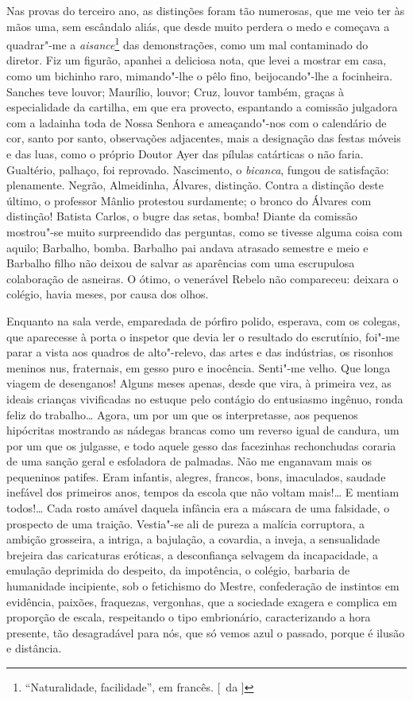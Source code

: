 Nas provas do terceiro ano, as distinções foram
tão numerosas, que me veio ter às mãos uma, sem escândalo aliás, que
desde muito perdera o medo e começava a quadrar"-me a \textit{aisance}\footnote{ ``Naturalidade, 
facilidade'', em francês. [~da ]} das
demonstrações, como um mal contaminado do diretor. Fiz um figurão,
apanhei a deliciosa nota, que levei a mostrar em casa, como um bichinho
raro, mimando"-lhe o pêlo fino, beijocando"-lhe a focinheira. Sanches
teve louvor; Maurílio, louvor; Cruz, louvor também, graças à
especialidade da cartilha, em que era provecto, espantando a comissão
julgadora com a ladainha toda de Nossa Senhora e ameaçando"-nos com o
calendário de cor, santo por santo, observações adjacentes, mais a
designação das festas móveis e das luas, como o próprio Doutor Ayer das
pílulas catárticas o não faria. Gualtério, palhaço, foi reprovado.
Nascimento, o \textit{bicanca}, fungou de satisfação: plenamente. Negrão,
Almeidinha, Álvares, distinção. Contra a distinção deste último, o
professor Mânlio protestou surdamente; o bronco do Álvares com
distinção! Batista Carlos, o bugre das setas, bomba! Diante da comissão
mostrou"-se muito surpreendido das perguntas, como se tivesse alguma
coisa com aquilo; Barbalho, bomba. Barbalho pai andava atrasado
semestre e meio e Barbalho filho não deixou de salvar as aparências com
uma escrupulosa colaboração de asneiras. O ótimo, o venerável Rebelo
não compareceu: deixara o colégio, havia meses, por causa dos olhos.

Enquanto na sala verde, emparedada de pórfiro polido, esperava, com os
colegas, que aparecesse à porta o inspetor que devia ler o resultado do
escrutínio, foi"-me parar a vista aos quadros de alto"-relevo, das artes
e das indústrias, os risonhos meninos nus, fraternais, em gesso puro e
inocência. Senti"-me velho. Que longa viagem de desenganos! Alguns
meses apenas, desde que vira, à primeira vez, as ideais crianças
vivificadas no estuque pelo contágio do entusiasmo ingênuo, ronda feliz
do trabalho\ldots{} Agora, um por um que os interpretasse, aos pequenos
hipócritas mostrando as nádegas brancas como um reverso igual de
candura, um por um que os julgasse, e todo aquele gesso das facezinhas
rechonchudas coraria de uma sanção geral e esfoladora de palmadas. Não
me enganavam mais os pequeninos patifes. Eram infantis, alegres,
francos, bons, imaculados, saudade inefável dos primeiros anos, tempos
da escola que não voltam mais!\ldots{} E mentiam todos!\ldots{} Cada rosto amável
daquela infância era a máscara de uma falsidade, o prospecto de uma
traição. Vestia"-se ali de pureza a malícia corruptora, a ambição
grosseira, a intriga, a bajulação, a covardia, a inveja, a sensualidade
brejeira das caricaturas eróticas, a desconfiança selvagem da
incapacidade, a emulação deprimida do despeito, da impotência, o
colégio, barbaria de humanidade incipiente, sob o fetichismo do Mestre,
confederação de instintos em evidência, paixões, fraquezas, vergonhas,
que a sociedade exagera e complica em proporção de escala, respeitando
o tipo embrionário, caracterizando a hora presente, tão desagradável
para nós, que só vemos azul o passado, porque é ilusão e distância.

